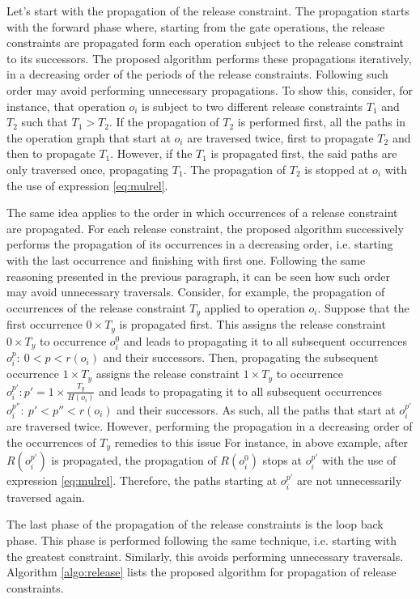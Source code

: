 Let's start with the propagation of the release constraint. The propagation starts with the forward phase where, starting from the gate operations, the release constraints are propagated form each operation subject to the release constraint to its successors. The proposed algorithm performs these propagations iteratively, in a decreasing order of the periods of the release constraints. Following such order may avoid performing unnecessary propagations. To show this, consider, for instance, that operation $o_i$ is subject to two different release constraints $T_{1}$ and $T_{2}$ such that $T_{1} > T_{2}$. If the propagation of $T_{2}$ is performed first, all the paths in the operation graph that start at $o_i$ are traversed twice, first to propagate $T_{2}$ and then to propagate $T_{1}$. However, if the $T_{1}$ is propagated first, the said paths are only traversed once, propagating $T_{1}$. The propagation of $T_{2}$ is stopped at $o_i$ with the use of expression \ref{eq:mulrel}.

The same idea applies to the order in which occurrences of a release constraint are propagated. For each release constraint, the proposed algorithm successively performs the propagation of its occurrences in a decreasing order, i.e. starting with the last occurrence and finishing with first one. Following the same reasoning presented in the previous paragraph, it can be seen how such order may avoid unnecessary traversals. Consider, for example, the propagation of occurrences of the release constraint $T_y$ applied to operation $o_i$. Suppose that the first occurrence $0 \times T_y$ is propagated first. This assigns the release constraint $0 \times T_y$ to occurrence $o_i^0$ and leads to propagating it to all subsequent occurrences $o_i^{p}:\ 0 < p < r(o_i) $ and their successors. Then, propagating the subsequent occurrence $1 \times T_y$ assigns the release constraint $1 \times T_y$ to occurrence $o_i^{p'}: p' = 1 \times \frac{T_y}{H(o_i)}$ and leads to propagating it to all subsequent occurrences $o_i^{p''}:\ p' < p'' < r(o_i) $ and their successors. As such, all the paths that start at $o_i^{p'}$ are traversed twice. However, performing the propagation in a decreasing order of the occurrences of $T_y$ remedies to this issue For instance, in above example, after $R(o_i^{p'})$ is propagated, 
the propagation of $R(o_i^0)$ stops at $o_i^{p'}$ with the use of expression \ref{eq:mulrel}. Therefore, the paths starting at $o_i^{p'}$ are not unnecessarily traversed again.

The last phase of the propagation of the release constraints is the loop back phase. This phase is performed following the same technique, i.e. starting with the greatest constraint. Similarly, this avoids performing unnecessary traversals. Algorithm \ref{algo:release} lists the proposed algorithm for propagation of release constraints.

